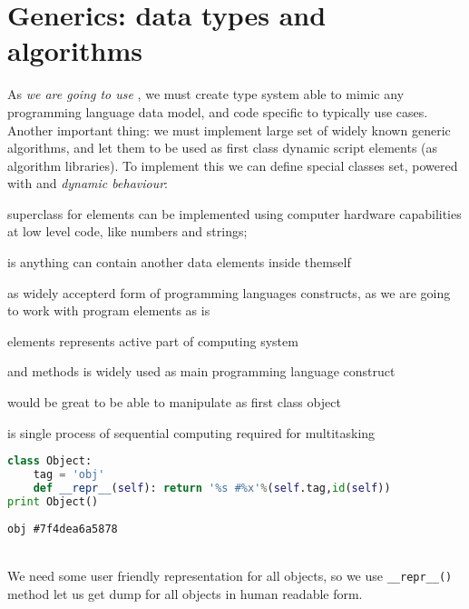 \chapter{Generics: data types and algorithms}\clearpage

As \emph{we are going to use }, we must create type
system able to mimic any programming language data model, and 
code specific to typically use cases. Another important thing: we must implement
large set of widely known generic algorithms, and let them to be used as
first class dynamic script elements (as algorithm libraries).
To implement this we can define special classes set, powered with
 and \emph{dynamic behaviour}:
\begin{description}[nosep]
\item[Primitive] superclass for elements can be implemented using
computer hardware capabilities at low level code, like numbers and strings;
\item[Collection] is anything can contain another data elements inside themself
\item[AST] as widely accepterd form of programming languages constructs, as
we are going to work with program elements as is
\item[Active] elements represents active part of computing system
\item[Function] and methods is widely used as main programming language
construct
\item[Algorithm] would be great to be able to manipulate as first class object
\item[Thread] is single process of sequential computing required for
multitasking
\end{description}



\begin{lstlisting}[language=Python]
class Object:
    tag = 'obj'
    def __repr__(self): return '%s #%x'%(self.tag,id(self))
print Object()
\end{lstlisting}
\begin{lstlisting}
obj #7f4dea6a5878
\end{lstlisting}
\\We need some user friendly representation for all objects, so we use
\verb|__repr__()| method let us get dump for all objects in human readable form.

